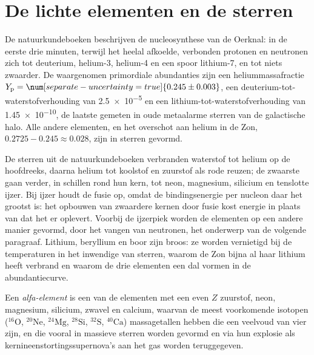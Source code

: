 \section{De lichte elementen en de sterren}\label{sec:b3:origin-of-elements:stars}

De natuurkundeboeken beschrijven de nucleosynthese van de Oerknal: in de
eerste drie minuten, terwijl het heelal afkoelde, verbonden protonen en
neutronen zich tot deuterium, helium-3, helium-4 en een spoor lithium-7, en
tot niets zwaarder. De waargenomen primordiale abundanties zijn een heliummassafractie
$Y_\mathrm{p} = \num[separate-uncertainty=true]{0.245 \pm 0.003}$, een
deuterium-tot-waterstofverhouding van \num{2.5e-5} en een
lithium-tot-waterstofverhouding van \num{1.45e-10}, de laatste gemeten in oude
metaalarme sterren van de galactische halo. Alle andere elementen, en het
overschot aan helium in de Zon, $0.2725 - 0.245 \approx 0.028$, zijn in sterren gevormd.

De sterren uit de natuurkundeboeken verbranden waterstof tot helium op de
hoofdreeks, daarna helium tot koolstof en zuurstof als rode reuzen; de
zwaarste gaan verder, in schillen rond hun kern, tot neon, magnesium,
silicium en tenslotte ijzer. Bij ijzer houdt de fusie op, omdat de
bindingsenergie per nucleon daar het grootst is: het opbouwen van zwaardere
kernen door fusie kost energie in plaats van dat het er oplevert. Voorbij de
ijzerpiek worden de elementen op een andere manier gevormd, door het
vangen van neutronen, het onderwerp van de volgende paragraaf. Lithium,
beryllium en boor zijn broos: ze worden vernietigd bij de temperaturen
in het inwendige van sterren, waarom de Zon bijna al haar lithium heeft
verbrand en waarom de drie elementen een dal vormen in de abundantiecurve.

\begin{definition}\label{def:b3:origin-of-elements:alpha}
Een \emph{alfa-element} is een van de elementen met een even $Z$
zuurstof, neon, magnesium, silicium, zwavel en calcium, waarvan de
meest voorkomende isotopen ($^{16}\mathrm{O}$, $^{20}\mathrm{Ne}$,
$^{24}\mathrm{Mg}$, $^{28}\mathrm{Si}$, $^{32}\mathrm{S}$,
$^{40}\mathrm{Ca}$) massagetallen hebben die een veelvoud van vier zijn, en
die vooral in massieve sterren worden gevormd en via hun explosie als
kernineenstortingssupernova's aan het gas worden teruggegeven.
\end{definition}

